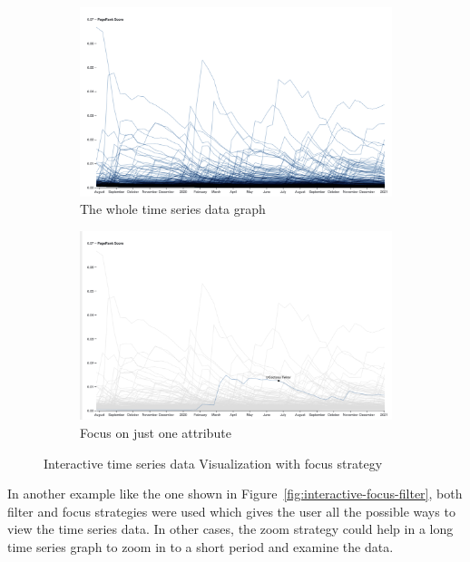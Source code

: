\begin{figure}[h]
\begin{subfigure}{.5\textwidth}
  \centering
  \captionsetup{justification=centering}
  \includegraphics[width=.8\linewidth]{Report-latex/tex_files/pics/time21.png}  
  \caption{The whole time series data graph}
  \label{fig:sub-first}
\end{subfigure}
\begin{subfigure}{.5\textwidth}
  \centering
  \captionsetup{justification=centering}
  \includegraphics[width=1\linewidth]{Report-latex/tex_files/pics/time22.png}  
  \caption{Focus on just one attribute}
  \label{fig:sub-second}
\end{subfigure}
\captionsetup{justification=centering}
\caption{Interactive time series data Visualization with focus strategy \cite{multiplelines} }
\label{fig:interactive-ts}
\end{figure}


In another example like the one shown in Figure~\ref{fig:interactive-focus-filter}, both filter and focus strategies were used which gives the user all the possible ways to view the time series data. In other cases, the zoom strategy could help in a long time series graph to zoom in to a short period and examine the data. 

